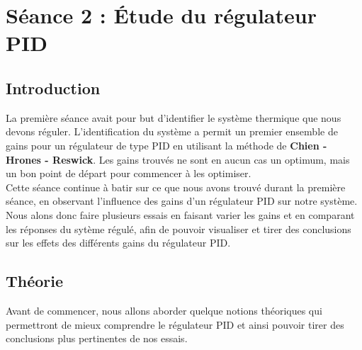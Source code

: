 \section{Séance 2 : \'Etude du régulateur PID}
\subsection{Introduction}
La première séance avait pour but d'identifier le système thermique que nous
devons réguler. L'identification du système a permit un premier ensemble de gains
pour un régulateur de type PID en utilisant la méthode de 
\textbf{Chien - Hrones - Reswick}. Les gains trouvés ne sont en aucun cas un optimum,
mais un bon point de départ pour commencer à les optimiser.\\

Cette séance continue à batir sur ce que nous avons trouvé durant la première séance,
en observant l'influence des gains d'un régulateur PID sur notre système. 
Nous alons donc faire plusieurs essais en faisant varier les gains et en comparant
les réponses du sytème régulé, afin de pouvoir visualiser et tirer des conclusions
sur les effets des différents gains du régulateur PID.
 

\subsection{Théorie}

Avant de commencer, nous allons aborder quelque notions théoriques
qui permettront de mieux comprendre le régulateur PID et ainsi
pouvoir tirer des conclusions plus pertinentes de nos essais.

